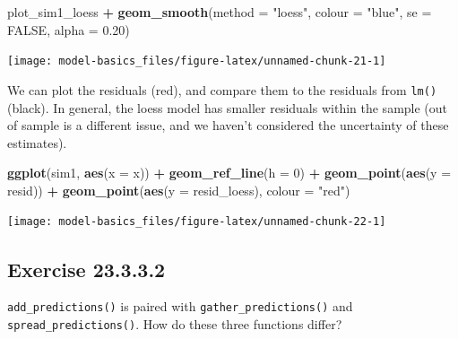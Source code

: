 \documentclass[]{book}
\newenvironment{Shaded}{\begin{snugshade}}{\end{snugshade}}
\newcommand{\DataTypeTok}[1]{\textcolor[rgb]{0.13,0.29,0.53}{#1}}
\newcommand{\DecValTok}[1]{\textcolor[rgb]{0.00,0.00,0.81}{#1}}
\newcommand{\FloatTok}[1]{\textcolor[rgb]{0.00,0.00,0.81}{#1}}
\newcommand{\KeywordTok}[1]{\textcolor[rgb]{0.13,0.29,0.53}{\textbf{#1}}}
\newcommand{\NormalTok}[1]{#1}
\newcommand{\OperatorTok}[1]{\textcolor[rgb]{0.81,0.36,0.00}{\textbf{#1}}}
\newcommand{\OtherTok}[1]{\textcolor[rgb]{0.56,0.35,0.01}{#1}}
\newcommand{\StringTok}[1]{\textcolor[rgb]{0.31,0.60,0.02}{#1}}
\theoremstyle{plain}
\theoremstyle{remark}
\begin{document}
\begin{Shaded}
\begin{Highlighting}[]
\NormalTok{plot_sim1_loess }\OperatorTok{+}
\StringTok{  }\KeywordTok{geom_smooth}\NormalTok{(}\DataTypeTok{method =} \StringTok{"loess"}\NormalTok{, }\DataTypeTok{colour =} \StringTok{"blue"}\NormalTok{, }\DataTypeTok{se =} \OtherTok{FALSE}\NormalTok{, }\DataTypeTok{alpha =} \FloatTok{0.20}\NormalTok{)}
\end{Highlighting}
\end{Shaded}

\begin{center}\texttt{[image: model-basics\_files/figure-latex/unnamed-chunk-21-1]} \end{center}

We can plot the residuals (red), and compare them to the residuals from \texttt{lm()} (black).
In general, the loess model has smaller residuals within the sample (out of sample is a different issue, and we haven't considered the uncertainty of these estimates).

\begin{Shaded}
\begin{Highlighting}[]
\KeywordTok{ggplot}\NormalTok{(sim1, }\KeywordTok{aes}\NormalTok{(}\DataTypeTok{x =}\NormalTok{ x)) }\OperatorTok{+}
\StringTok{  }\KeywordTok{geom_ref_line}\NormalTok{(}\DataTypeTok{h =} \DecValTok{0}\NormalTok{) }\OperatorTok{+}
\StringTok{  }\KeywordTok{geom_point}\NormalTok{(}\KeywordTok{aes}\NormalTok{(}\DataTypeTok{y =}\NormalTok{ resid)) }\OperatorTok{+}
\StringTok{  }\KeywordTok{geom_point}\NormalTok{(}\KeywordTok{aes}\NormalTok{(}\DataTypeTok{y =}\NormalTok{ resid_loess), }\DataTypeTok{colour =} \StringTok{"red"}\NormalTok{)}
\end{Highlighting}
\end{Shaded}

\begin{center}\texttt{[image: model-basics\_files/figure-latex/unnamed-chunk-22-1]} \end{center}

\hypertarget{exercise-23.3.3.2}{%
\subsection*{\texorpdfstring{Exercise {23.3.3.2}}{Exercise 23.3.3.2}}\label{exercise-23.3.3.2}}

\texttt{add\_predictions()} is paired with \texttt{gather\_predictions()} and \texttt{spread\_predictions()}.
How do these three functions differ?
\end{document}
